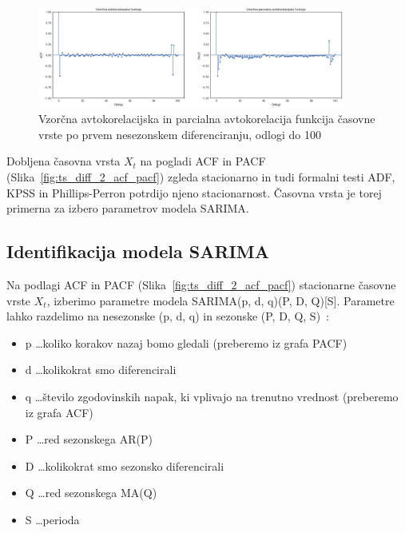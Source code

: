 \documentclass[a4paper, 11pt]{article}
\begin{document}
\begin{figure}[h!]
    \caption{Vzorčna avtokorelacijska in parcialna avtokorelacija funkcija časovne vrste po prvem nesezonskem diferenciranju, odlogi do 100}\par\medskip
    \centering
    \label{fig:ts_diff_2_acf_pacf_do_100}
    \includegraphics[width=0.9\textwidth]{ts_diff_2_acf_pacf_do_100.png}
\end{figure}

\noindent Dobljena časovna vrsta $X_t$ na pogladi ACF in PACF (Slika~\ref{fig:ts_diff_2_acf_pacf}) 
zgleda stacionarno in tudi formalni testi ADF, 
KPSS in Phillips-Perron potrdijo njeno stacionarnost. 
Časovna vrsta je torej primerna za izbero parametrov modela SARIMA. 


\subsection{Identifikacija modela SARIMA}

\noindent Na podlagi ACF in PACF (Slika~\ref{fig:ts_diff_2_acf_pacf}) stacionarne časovne vrste $X_t$, izberimo parametre 
modela SARIMA(p, d, q)(P, D, Q)[S]. Parametre lahko razdelimo na nesezonske (p, d, q) in sezonske (P, D, Q, S)~\cite{SARIMA_param}:

\begin{itemize}
    \item p \dots koliko korakov nazaj bomo gledali (preberemo iz grafa PACF)
    \item d \dots kolikokrat smo diferencirali 
    \item q \dots število zgodovinskih napak, ki vplivajo na trenutno vrednost (preberemo iz grafa ACF)
    \item P \dots red sezonskega AR(P)
    \item D \dots kolikokrat smo sezonsko diferencirali
    \item Q \dots red sezonskega MA(Q)
    \item S \dots perioda
\end{itemize}
\end{document}
